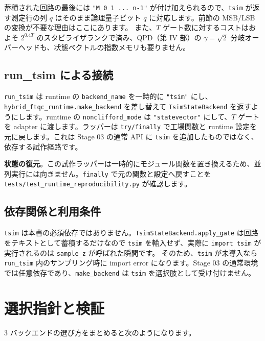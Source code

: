 蓄積された回路の最後には \texttt{"M 0 1 ... n-1"} が付け加えられるので、\texttt{tsim} が返す測定行の列 $q$ はそのまま論理量子ビット $q$ に対応します。前節の MSB/LSB の変換が不要な理由はここにあります。
また、$T$ ゲート数に対するコストはおよそ $2^{0.4T}$ のスタビライザランクで済み、QPD（第 IV 部）の $\gamma=\sqrt2$ 分岐オーバーヘッドも、状態ベクトルの指数メモリも要りません。

\subsection{run\_tsim による接続}

\texttt{run\_tsim} は runtime の \texttt{backend\_name} を一時的に \texttt{"tsim"} にし、\texttt{hybrid\_ftqc\_runtime.}\allowbreak\texttt{make\_backend} を差し替えて \texttt{TsimStateBackend} を返すようにします。runtime の \texttt{nonclifford\_mode} は \texttt{"statevector"} にして、$T$ ゲートを adapter に渡します。ラッパーは \texttt{try/finally} で工場関数と runtime 設定を元に戻します。これは Stage 03 の通常 API に \texttt{tsim} を追加したものではなく、依存する試作経路です。

\begin{notebox}
  \textbf{状態の復元}。この試作ラッパーは一時的にモジュール関数を置き換えるため、並列実行には向きません。\texttt{finally} で元の関数と設定へ戻すことを \texttt{tests/test\_runtime\_reproducibility.py} が確認します。
\end{notebox}

\subsection{依存関係と利用条件}

\texttt{tsim} は本書の必須依存ではありません。\texttt{TsimStateBackend.apply\_gate} は回路をテキストとして蓄積するだけなので \texttt{tsim} を輸入せず、実際に \texttt{import tsim} が実行されるのは \texttt{sample\_z} が呼ばれた瞬間です。
そのため、\texttt{tsim} が未導入なら \texttt{run\_tsim} 内のサンプリング時に import error になります。Stage 03 の通常環境では任意依存であり、\texttt{make\_backend} は \texttt{tsim} を選択肢として受け付けません。

\section{選択指針と検証}\label{sec:backend_choice}

3 バックエンドの選び方をまとめると次のようになります。

